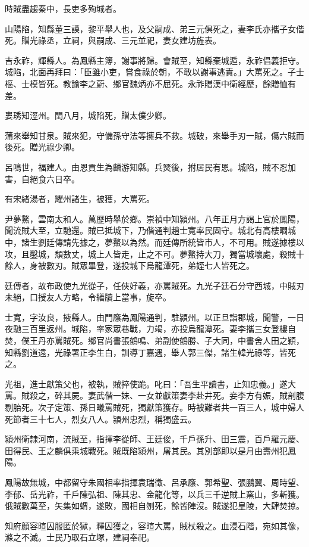\begin{pinyinscope}
時賊盡趨秦中，長吏多殉城者。

山陽陷，知縣董三謨，黎平舉人也，及父嗣成、弟三元俱死之，妻李氏亦攜子女偕死。贈光祿丞，立祠，與嗣成、三元並祀，妻女建坊旌表。

吉永祚，輝縣人。為鳳縣主簿，謝事將歸。會賊至，知縣棄城遁，永祚倡義拒守。城陷，北面再拜曰：「臣雖小吏，嘗食祿於朝，不敢以謝事逃責。」大罵死之。子士樞、士模皆死。教諭李之蔚、鄉官魏炳亦不屈死。永祚贈漢中衛經歷，餘贈恤有差。

婁琇知涇州。閏八月，城陷死，贈太僕少卿。

蒲來舉知甘泉。賊來犯，守備孫守法等擁兵不救。城破，來舉手刃一賊，傷六賊而後死。贈光祿少卿。

呂鳴世，福建人。由恩貢生為麟游知縣。兵燹後，拊居民有恩。城陷，賊不忍加害，自絕食六日卒。

有宋緒湯者，耀州諸生，被獲，大罵死。

尹夢鰲，雲南太和人。萬歷時舉於鄉。崇禎中知潁州。八年正月方謁上官於鳳陽，聞流賊大至，立馳還。賊已抵城下，乃偕通判趙士寬率民固守。城北有高樓瞷城中，諸生劉廷傳請先據之，夢鰲以為然。而廷傳所統皆市人，不可用。賊遂據樓以攻，且鑿城，頹數丈，城上人皆走，止之不可。夢鰲持大刀，獨當城壞處，殺賊十餘人，身被數刃。賊眾畢登，遂投城下烏龍潭死，弟姪七人皆死之。

廷傳者，故布政使九光從子，任俠好義，亦罵賊死。九光子廷石分守西城，中賊刃未絕，口授友人方略，令繕牘上當事，旋卒。

士寬，字汝良，掖縣人。由門廕為鳳陽通判，駐潁州。以正旦詣郡城，聞警，一日夜馳三百里返州。城陷，率家眾巷戰，力竭，亦投烏龍潭死。妻李攜三女登樓自焚，僕王丹亦罵賊死。鄉官尚書張鶴鳴、弟副使鶴勝、子大同，中書舍人田之穎，知縣劉道遠，光祿署正李生白，訓導丁嘉遇，舉人郭三傑，諸生韓光祿等，皆死之。

光祖，進士獻策父也，被執，賊捽使跪。叱曰：「吾生平讀書，止知忠義。」遂大罵。賊殺之，碎其屍。妻武偕一妹、一女並獻策妻李赴井死。妾李方有娠，賊剖腹剔胎死。次子定策、孫日曦罵賊死，獨獻策獲存。時被難者共一百三人，城中婦人死節者三十七人，烈女八人。潁州忠烈，稱獨盛云。

潁州衛隸河南，流賊至，指揮李從師、王廷俊，千戶孫升、田三震，百戶羅元慶、田得民、王之麟俱乘城戰死。賊既陷潁州，屠其民。其別部即以是月由壽州犯鳳陽。

鳳陽故無城，中都留守朱國相率指揮袁瑞徵、呂承廕、郭希聖、張鵬翼、周時望、李郁、岳光祚，千戶陳弘祖、陳其忠、金龍化等，以兵三千逆賊上窯山，多斬獲。俄賊數萬至，矢集如蝟，遂敗，國相自刎死，餘皆陣沒。賊遂犯皇陵，大肆焚掠。

知府顏容暄囚服匿於獄，釋囚獲之，容暄大罵，賊杖殺之。血浸石階，宛如其像，滌之不滅。士民乃取石立塚，建祠奉祀。


\end{pinyinscope}
